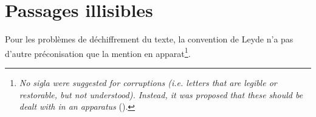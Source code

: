 \documentclass[a4paper,12pt,twoside]{book}
\newcommand{\langue}[1]{\emph{#1}}
\begin{document}
		\section{Passages illisibles}
			Pour les problèmes de déchiffrement du texte, la convention de Leyde n'a pas d'autre préconisation que la mention en apparat\footnote{\langue{No sigla were suggested for corruptions (i.e. letters that are legible or restorable, but not understood). Instead, it was proposed that these should be dealt with in an apparatus} (\cite{leidenConvention}).}.
      	
	\printglossaries
	
	\printbibheading[heading=bibintoc]
	
	\printbibliography[heading=subbibliography, title=Scripts, keyword=scripts]

    \printbibliography[heading=subbibliography, title=Valorisation du projet, keyword=valorisation]
  
\end{document}
